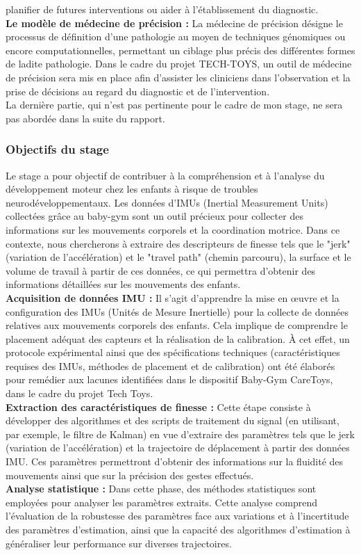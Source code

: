 \documentclass[8pt]{article}
\begin{document}
planifier de futures interventions ou aider à l’établissement du diagnostic. \\
\textbf{Le modèle de médecine de précision : } La médecine de précision désigne le processus de définition
d’une pathologie au moyen de techniques génomiques ou encore computationnelles, permettant un ciblage
plus précis des différentes formes de ladite pathologie. Dans le cadre du projet TECH-TOYS, un
outil de médecine de précision sera mis en place afin d’assister les cliniciens dans l’observation et la prise
de décisions au regard du diagnostic et de l’intervention. \\

La dernière partie, qui n'est pas pertinente pour le cadre de mon stage, ne sera pas abordée dans la suite du rapport.

\subsubsection{Objectifs du stage}

Le stage a pour objectif de contribuer à la compréhension et à l'analyse du développement moteur chez les enfants à risque de troubles neurodéveloppementaux. Les données d'IMUs (Inertial Measurement Units) collectées grâce au baby-gym sont un outil précieux pour collecter des informations sur les mouvements corporels et la coordination motrice. Dans ce contexte, nous chercherons à extraire des descripteurs de finesse tels que le "jerk" (variation de l'accélération) et le "travel path" (chemin parcouru), la surface et le volume de travail à partir de ces données, ce qui permettra d'obtenir des informations détaillées sur les mouvements des enfants. \\
\textbf{Acquisition de données IMU :} Il s'agit d'apprendre la mise en œuvre et la configuration des IMUs (Unités de Mesure Inertielle) pour la collecte de données relatives aux mouvements corporels des enfants. Cela implique de comprendre le placement adéquat des capteurs et la réalisation de la calibration. À cet effet, un protocole expérimental ainsi que des spécifications techniques (caractéristiques requises des IMUs, méthodes de placement et de calibration) ont été élaborés pour remédier aux lacunes identifiées dans le dispositif Baby-Gym CareToys, dans le cadre du projet Tech Toys.\\
\textbf{Extraction des caractéristiques de finesse :} Cette étape consiste à développer des algorithmes et des scripts de traitement du signal (en utilisant, par exemple, le filtre de Kalman) en vue d'extraire des paramètres tels que le jerk (variation de l'accélération) et la trajectoire de déplacement à partir des données IMU. Ces paramètres permettront d'obtenir des informations sur la fluidité des mouvements ainsi que sur la précision des gestes effectués.\\
\textbf{Analyse statistique :} Dans cette phase, des méthodes statistiques sont employées pour analyser les paramètres extraits. Cette analyse comprend l'évaluation de la robustesse des paramètres face aux variations et à l'incertitude des paramètres d'estimation, ainsi que la capacité des algorithmes d'estimation à généraliser leur performance sur diverses trajectoires.
\end{document}
